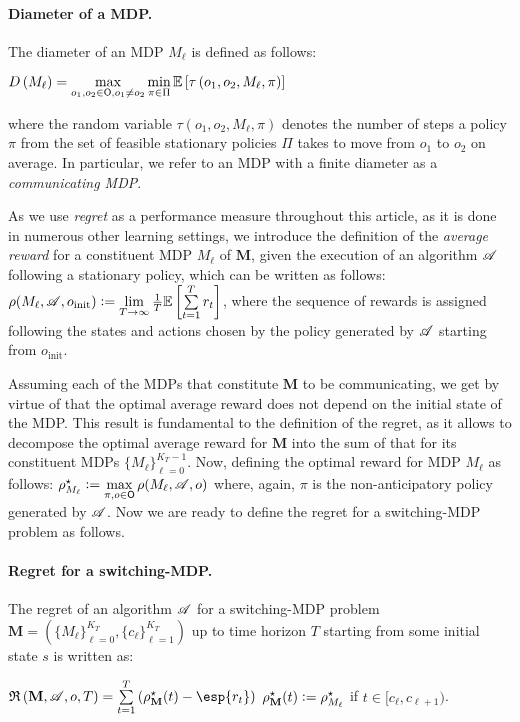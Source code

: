 \documentclass{article} %
\newcommand{\dfq}{\vcentcolon=}
\begin{document}
\paragraph{Diameter of a MDP.} The diameter of an MDP $M_\ell$ is  defined as follows:
\begin{center}
        $
        D\left(M_\ell\right) = \max\limits_{o_1, o_2 \in {\mathsf{O}}, o_1 \neq o_2}\min\limits_{\pi \in \Pi} \mathbb{E}\left[\tau\left(o_1,o_2,M_\ell,\pi\right)\right] $
\end{center}

where the random variable $\tau\left(o_1,o_2,M_\ell,\pi\right)$ denotes the number of steps a policy $\pi$ from the set of feasible stationary policies $\Pi$ takes to move from $o_1$ to $o_2$ on average. In particular, we refer to an MDP with a finite  diameter as a \textit{communicating MDP}. 

As we use \textit{regret} as a performance measure throughout this article, as it is done in numerous other learning settings, we introduce the definition of the \textit{average reward} for a constituent MDP $M_\ell$ of $\mathbf{M}$, given the execution of an algorithm ${\mathcal{A}}$ following a stationary policy, which can be written as follows: $\rho(M_\ell, \gA, o_{\text{init}}) \dfq \lim\limits_{T \to \infty} \frac{1}{T} \mathbb{E}\left[\sum\limits_{t=1}^{T}  r_t\right]$, where the sequence of rewards is assigned following the states and actions chosen by the policy generated by ${\mathcal{A}}$ starting from $o_{\text{init}}$. 

Assuming each of the MDPs that constitute $\mathbf{M}$ to be communicating, we get by virtue of \cite{puterman2014markov} that the optimal average reward does not depend on the initial state of the MDP. This result is fundamental to the definition of the regret, as it allows to decompose the optimal average reward for $\mathbf{M}$ into the sum of that for its constituent MDPs $\{M_\ell\}_{\ell=0}^{K_T-1}$. Now, defining the optimal reward for MDP $M_\ell$ as follows: $\rho_{M_\ell}^{\star} \dfq  \max\limits_{\pi, o \in \sO} \rho(M_\ell, \gA, o)$
where, again, $\pi$ is the non-anticipatory policy generated by ${\mathcal{A}}$.  Now we are ready to define the regret for a switching-MDP problem as follows.

\paragraph{Regret for a switching-MDP.} The regret of an algorithm ${\mathcal{A}}$ for a switching-MDP problem $\mathbf{M} = \left(\{M_\ell\}_{\ell=0}^{K_T}, \{c_\ell\}_{\ell=1}^{K_T}\right)$ up to time horizon $T$ starting from some initial state $s$ is written as: 
\begin{center}
    $\mathfrak{R}\left(\mathbf{M}, \gA, o, T\right) = \sum\limits_{t=1}^T\left(\rho_{\mathbf{M}}^\star(t)- \esp{r_t} \right) $ \quad {} \quad $\rho_{\mathbf{M}}^\star(t) \dfq \rho_{M_\ell}^\star$ if $t \in [c_\ell, c_{\ell+1})$. 
\end{center}
\end{document}

